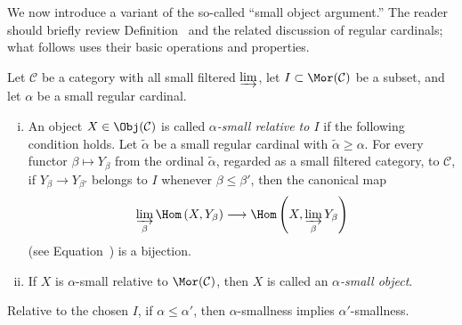 We now introduce a variant of the so-called ``small object argument.'' The
reader should briefly review Definition~
and the related discussion of regular cardinals; what follows uses their basic
operations and properties.

\begin{definition}\label{def:I-small}
	Let $\mathcal{C}$ be a category with all small filtered $\varinjlim$, let
	$I\subset\Mor(\mathcal{C})$ be a subset, and let $\alpha$ be a small
	regular cardinal.
	\begin{enumerate}[(i)]
		\item An object $X\in\Obj(\mathcal{C})$ is called
		\emph{$\alpha$-small relative to $I$} if the following condition holds.
		Let $\widetilde{\alpha}$ be a small regular cardinal with
		$\widetilde{\alpha}\geq\alpha$. For every functor
		$\beta\mapsto Y_\beta$ from the ordinal $\widetilde{\alpha}$, regarded
		as a small filtered category, to $\mathcal{C}$, if
		$Y_\beta\to Y_{\beta'}$ belongs to $I$ whenever
		$\beta\leq\beta'$, then the canonical map
		\[\varinjlim_\beta\Hom\left(X,Y_\beta\right)
		\longrightarrow\Hom\left(X,\varinjlim_\beta Y_\beta\right)\]
		(see Equation~) is a bijection.

		\item If $X$ is $\alpha$-small relative to
		$\Mor(\mathcal{C})$, then $X$ is called an \emph{$\alpha$-small
		object}.
	\end{enumerate}
\end{definition}

Relative to the chosen $I$, if $\alpha\leq\alpha'$, then $\alpha$-smallness
implies $\alpha'$-smallness.

